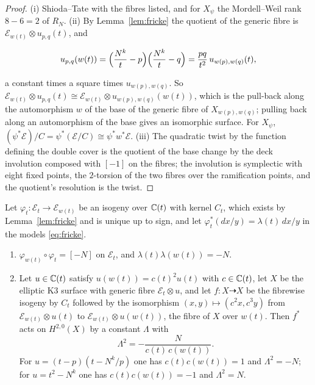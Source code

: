 \begin{proof}
(i) Shioda--Tate with the fibres listed, and for $X_{\psi}$ the Mordell--Weil rank $8-6=2$ of $R_{N}$. (ii) By Lemma~\ref{lem:fricke} the quotient of the generic fibre is $\mathcal{E}_{w(t)}\otimes u_{p,q}(t)$, and
\begin{widetext}
\begin{equation}\label{eq:frickeu}
u_{p,q}(w(t))=\Bigl(\frac{N^{k}}{t}-p\Bigr)\Bigl(\frac{N^{k}}{t}-q\Bigr)=\frac{pq}{t^{2}}\,u_{w(p),w(q)}(t),
\end{equation}
\end{widetext}
a constant times a square times $u_{w(p),w(q)}$. So $\mathcal{E}_{w(t)}\otimes u_{p,q}(t)\cong\mathcal{E}_{w(t)}\otimes u_{w(p),w(q)}(w(t))$, which is the pull-back along the automorphism $w$ of the base of the generic fibre of $X_{w(p),w(q)}$; pulling back along an automorphism of the base gives an isomorphic surface. For $X_{\psi}$, $(\psi^{*}\mathcal{E})/C=\psi^{*}(\mathcal{E}/C)\cong\psi^{*}w^{*}\mathcal{E}$. (iii) The quadratic twist by the function defining the double cover is the quotient of the base change by the deck involution composed with $[-1]$ on the fibres; the involution is symplectic with eight fixed points, the $2$-torsion of the two fibres over the ramification points, and the quotient's resolution is the twist.
\end{proof}

\begin{lemma}\label{lem:frickesign}
Let $\varphi_{t}\colon\mathcal{E}_{t}\to\mathcal{E}_{w(t)}$ be an isogeny over $\mathbb{C}(t)$ with kernel $C_{t}$, which exists by Lemma~\ref{lem:fricke} and is unique up to sign, and let $\varphi_{t}^{*}(dx/y)=\lambda(t)\,dx/y$ in the models \eqref{eq:fricke}.
\begin{enumerate}[label=\textup{(\roman*)},leftmargin=2.4em,itemsep=2pt]
\item $\varphi_{w(t)}\circ\varphi_{t}=[-N]$ on $\mathcal{E}_{t}$, and $\lambda(t)\lambda(w(t))=-N$.
\item Let $u\in\mathbb{C}(t)$ satisfy $u(w(t))=c(t)^{2}u(t)$ with $c\in\mathbb{C}(t)$, let $X$ be the elliptic K3 surface with generic fibre $\mathcal{E}_{t}\otimes u$, and let $f\colon X\dashrightarrow X$ be the fibrewise isogeny by $C_{t}$ followed by the isomorphism $(x,y)\mapsto(c^{2}x,c^{3}y)$ from $\mathcal{E}_{w(t)}\otimes u(t)$ to $\mathcal{E}_{w(t)}\otimes u(w(t))$, the fibre of $X$ over $w(t)$. Then $f^{*}$ acts on $H^{2,0}(X)$ by a constant $\Lambda$ with
\[
\Lambda^{2}=-\frac{N}{c(t)\,c(w(t))}.
\]
For $u=(t-p)(t-N^{k}/p)$ one has $c(t)c(w(t))=1$ and $\Lambda^{2}=-N$; for $u=t^{2}-N^{k}$ one has $c(t)c(w(t))=-1$ and $\Lambda^{2}=N$.
\end{enumerate}
\end{lemma}


